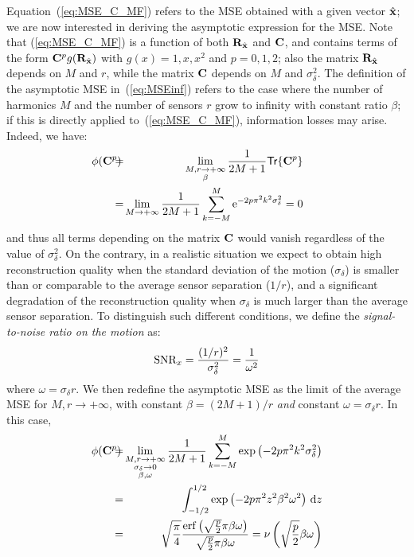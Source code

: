 \documentclass[final, a4paper]{IEEEtran}
\newcommand{\ee}{{\rm e}}
\newcommand{\erf}{{\rm erf}}
\newcommand{\xv}{{\bf x}}
\newcommand{\Cm}{{\bf C}}
\newcommand{\Rm}{{\bf R}}
\def\xvh{{\hat{\xv}}}
\def\trace{\mathsf{Tr}}
\def\non{\nonumber\\}
\def\limbeta{\lim_{\substack{M,r\rightarrow +\infty \\\beta}}}
\def\limbetaomega{\lim_{\substack{M,r\rightarrow +\infty \\ \sigma_\delta\rightarrow 0
                         \\\beta, \omega}}}
\begin{document}
Equation~(\ref{eq:MSE_C_MF}) refers to the MSE obtained with a given
vector $\xvh$; we are now interested in deriving the asymptotic
expression for the MSE.
Note that (\ref{eq:MSE_C_MF}) is a function of both $\Rm_\xvh$ and $\Cm$, and
contains terms of the form
$\Cm^pg(\Rm_\xvh)$ with $g(x)=1,x,x^2$ and $p=0,1,2$;
also the matrix $\Rm_\xvh$ depends on $M$ and $r$, while the matrix
$\Cm$ depends on $M$ and $\sigma^2_\delta$.
The definition of the asymptotic MSE in~(\ref{eq:MSEinf}) refers to
the case where the number of harmonics $M$ and the number of sensors $r$ grow
to infinity with constant ratio $\beta$; if this is directly applied
to~(\ref{eq:MSE_C_MF}), information losses may arise. Indeed, we
have:
\begin{eqnarray}
\hspace{-6mm} \phi(\Cm^p) \hspace{-3mm} &= &\hspace{-3mm} \limbeta \frac{1}{2M+1}\trace\{\Cm^p\}\non
\hspace{-3mm} & =&\hspace{-3mm} \lim_{M\rightarrow +\infty}  \frac{1}{2M+1}
\sum_{k=-M}^M \ee^{-2p\pi^2 k^2 \sigma^2_\delta}=0
\end{eqnarray}
and thus all terms depending on the matrix $\Cm$ would vanish
regardless of the value of $\sigma^2_\delta$. On the contrary, in a
realistic situation we expect to obtain high reconstruction quality
when the standard deviation of the motion ($\sigma_\delta$) is
smaller than or comparable to the average sensor separation ($1/r$),
and a significant degradation of the reconstruction quality when
$\sigma_\delta$ is much larger than the average sensor separation.
To distinguish such different conditions, we define the {\em
signal-to-noise ratio on the motion} as:
\[ {\rm SNR}_{x} =\frac{(1/r)^2}{\sigma^2_\delta} = \frac{1}{\omega^2}\]
where $\omega=\sigma_\delta r$.
We then redefine the asymptotic MSE as the limit of the average MSE
for $M,r\rightarrow+\infty$, with constant $\beta=(2M+1)/r$ {\em and} constant
$\omega=\sigma_{\delta} r$.
In this case,
\begin{eqnarray}
\phi(\Cm^p)
\hspace{-3mm}&=& \hspace{-3mm}\limbetaomega \frac{1}{2M+1} \sum_{k=-M}^M \exp\left(-2p\pi^2 k^2 \sigma^2_\delta\right) \non
\hspace{-3mm}&=& \hspace{-3mm}\int_{-1/2}^{1/2} \exp\left(-2p\pi^2 z^2 \beta^2\omega^2\right) \dd z \non
\hspace{-3mm}&=& \hspace{-3mm}\sqrt{\frac{\pi}{4}}\frac{\erf\left(\sqrt{\frac{p}{2}}\pi\beta\omega\right)}{\sqrt{\frac{p}{2}}\pi\beta\omega}
=\nu\left(\sqrt{\frac{p}{2}} \beta\omega\right)
\label{eq:limit_Mp}
\end{eqnarray}
\end{document}
